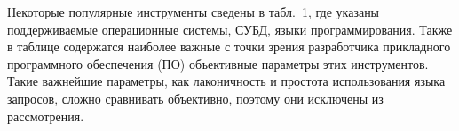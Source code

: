 \begin{multicols}{2}
Некоторые популярные инструменты сведены в табл.~1, где указаны поддерживаемые 
операционные системы, СУБД, языки программирования. Также в таблице содержатся 
наиболее важные с точки зрения разработчика прикладного программного
обеспечения (ПО) объективные параметры 
этих инструментов. Такие важнейшие параметры, как лаконичность и простота 
использования языка запросов, сложно сравнивать объективно, поэтому они исключены 
из рассмотрения.


\end{multicols}

\begin{table}[b]\small
\vspace*{-24pt}
\begin{center}
\vspace*{2ex}


\end{center}
\end{table}
